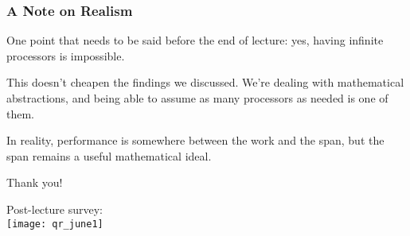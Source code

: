 \documentclass[aspectratio=169, handout]{beamer}
\begin{document}
\begin{frame}[fragile]
  \frametitle{ A Note on Realism }

  One point that needs to be said before the end of lecture: yes, having
  infinite processors is impossible\footnotemark.

  \pause
  \vspace{\fill}

  This doesn't cheapen the findings we discussed. We're dealing with 
  mathematical abstractions, and being able to assume as many processors
  as needed is one of them.

  \pause
  \vspace{\fill}

  In reality, performance is somewhere between the work and the span, but
  the span remains a useful mathematical ideal.

\end{frame}

\begin{frame}[plain]
	\begin{center} Thank you! \end{center}

	\begin{center} 
    Post-lecture survey: \\
    \vspace{5pt}
    \texttt{[image: qr\_june1]}
  \end{center}
\end{frame}
\end{document}
